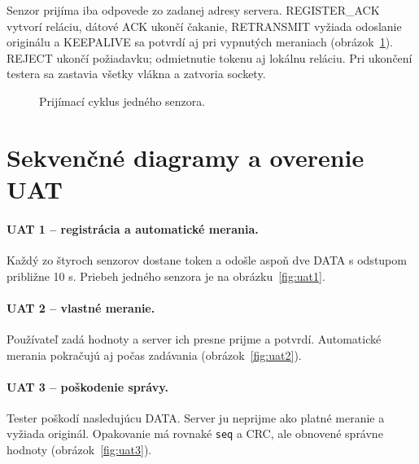 \documentclass[12pt,a4paper]{article}
\begin{document}
Senzor prijíma iba odpovede zo zadanej adresy servera. REGISTER\_ACK vytvorí reláciu, dátové ACK ukončí čakanie, RETRANSMIT vyžiada odoslanie originálu a KEEPALIVE sa potvrdí aj pri vypnutých meraniach (obrázok~\ref{fig:tester-receive}). REJECT ukončí požiadavku; odmietnutie tokenu aj lokálnu reláciu. Pri ukončení testera sa zastavia všetky vlákna a zatvoria sockety.

\begin{figure}[!htbp]
\centering

\caption{Prijímací cyklus jedného senzora.}
\label{fig:tester-receive}
\end{figure}

\clearpage
\section{Sekvenčné diagramy a overenie UAT}

\paragraph{UAT 1 -- registrácia a automatické merania.}
Každý zo štyroch senzorov dostane token a odošle aspoň dve DATA s odstupom približne 10 s. Priebeh jedného senzora je na obrázku~\ref{fig:uat1}.

\begin{center}
\centering

\label{fig:uat1}
\end{center}

\paragraph{UAT 2 -- vlastné meranie.}
Používateľ zadá hodnoty a server ich presne prijme a potvrdí. Automatické merania pokračujú aj počas zadávania (obrázok~\ref{fig:uat2}).

\begin{center}
\centering

\label{fig:uat2}
\end{center}

\clearpage
\paragraph{UAT 3 -- poškodenie správy.}
Tester poškodí nasledujúcu DATA. Server ju neprijme ako platné meranie a vyžiada originál. Opakovanie má rovnaké \texttt{seq} a CRC, ale obnovené správne hodnoty (obrázok~\ref{fig:uat3}).
\end{document}
